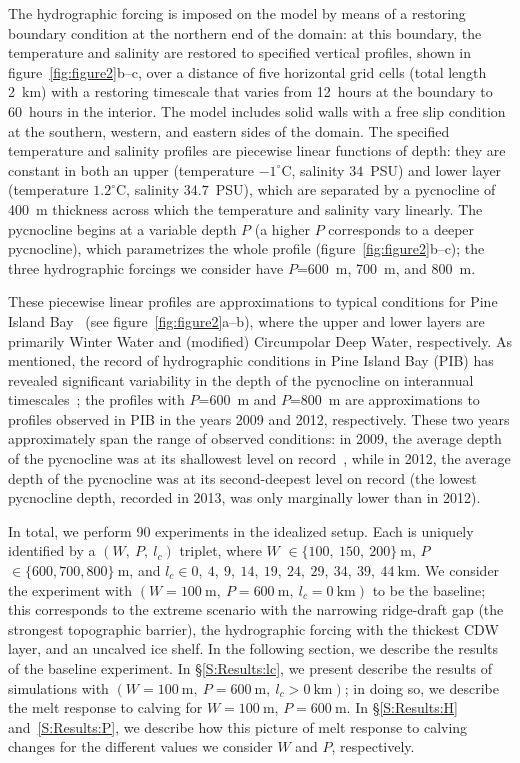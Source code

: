 \documentclass[draft]{agujournal2019}
\begin{document}
The hydrographic forcing is imposed on the model by means of a restoring boundary condition at the northern end of the domain: at this boundary, the temperature and salinity are restored to specified vertical profiles, shown in figure~\ref{fig:figure2}b--c, over a distance of five horizontal grid cells (total length 2 km) with a restoring timescale that varies from 12~hours at the boundary to 60~hours in the interior. The model includes solid walls with a free slip condition at the southern, western, and eastern sides of the domain. The specified temperature and salinity profiles are piecewise linear functions of depth: they are constant in both an upper (temperature $-1^\circ$C, salinity $34$~PSU) and lower layer (temperature $1.2^\circ$C, salinity $34.7$~PSU), which are separated by a pycnocline of 400~m thickness across which the temperature and salinity vary linearly. The pycnocline begins at a variable depth $P$ (a higher $P$ corresponds to a deeper pycnocline), which parametrizes the whole profile (figure~\ref{fig:figure2}b--c); the three hydrographic forcings we consider have $P$=600 m, 700 m, and 800 m. 

These piecewise linear profiles are approximations to typical conditions for Pine Island Bay~\cite{Jacobs1996GRL, Dutrieux2014Science, Jenkins2018NatureGeo} (see figure~\ref{fig:figure2}a--b), where the upper and lower layers are primarily Winter Water and (modified) Circumpolar Deep Water, respectively. As mentioned, the record of hydrographic conditions in Pine Island Bay (PIB) has revealed significant variability in the depth of the pycnocline on interannual timescales~\cite{Dutrieux2014Science}; the profiles with $P$=600~m and $P$=800~m are approximations to profiles observed in PIB in the years 2009 and 2012, respectively. These two years approximately span the range of observed conditions: in 2009, the average depth of the pycnocline was at its shallowest level on record~\cite{Webber2017NatureComms}, while in 2012, the average depth of the pycnocline was at its second-deepest level on record (the lowest pycnocline depth, recorded in 2013, was only marginally lower than in 2012).

In total, we perform 90 experiments in the idealized setup. Each is uniquely identified by a $(W,~P,~l_c)$ triplet, where $W$ $\in \{100,~150,~200\}~\text{m}$, $P$ $\in \{600, 700, 800\}~\text{m}$, and $l_c \in {0,~4,~9,~14,~19,~24,~29,~34,~39,~44}~\text{km}$. We consider the experiment with $(W=100~\text{m},~P=600~\text{m},~l_c=0~\text{km}) $ to be the baseline; this corresponds to the extreme scenario with the narrowing ridge-draft gap (the strongest topographic barrier), the hydrographic forcing with the thickest CDW layer, and an uncalved ice shelf. In the following section, we describe the results of the baseline experiment. In \S\ref{S:Results:lc}, we present describe the results of simulations with $(W=100~\text{m},~P=600~\text{m},~l_c>0~\text{km})$; in doing so, we describe the melt response to calving for $W=100~\text{m}$, $P = 600~\text{m}$. In \S\ref{S:Results:H} and~\ref{S:Results:P}, we describe how this picture of melt response to calving changes for the different values we consider $W$ and $P$, respectively.
\end{document}
